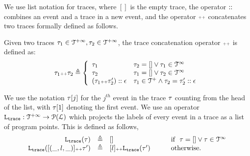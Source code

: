 We use list notation for traces, where $[]$ is the empty trace, the operator ${\small ::}$ combines an event and a trace in a new event, 
and the operator ${\scriptscriptstyle ++}$ concatenates two traces formally defined as follows. 
\begin{defn}
  \label{def:trace_concate}
Given two traces $\mathtt{\tau}_1 \in \mathcal{T}^{+\infty}, \mathtt{\tau}_2 \in \mathcal{T}^{+\infty}$, the trace concatenation operator 
${\scriptscriptstyle ++}$ is defined as:
\[
\trace_1 \tracecat \trace_2 \triangleq
\left\{
\begin{array}{ll} 
  \trace_1 & \trace_2 = [] \lor \trace_1 \in \inftdom \\
  \trace_2 & \trace_1 = [] \lor \trace_2 \in \inftdom \\
  (\trace_1   \tracecat \trace_2'):: \event & \trace_1 \in \ftdom \land \trace_2 = \trace_2' :: \event
\end{array}
\right.
\]
\end{defn}
We use the notation $\mathtt{\tau}[j]$ for the $j^{th}$ event in the trace $\mathtt{\tau}$ counting from the head of the list, with $\mathtt{\tau}[1]$ denoting the first event.
We use an operator $\mathtt{L}_{\mathtt{{trace}}}: \mathcal{T}^{+\infty} \to \mathcal{P}{(\mathcal{L})}$ which projects the labels of every event in a trace as a list of program points. This is defined as follows,
\[
\begin{array}{rcll}
\mathtt{L}_{\mathtt{{trace}}}(\mathtt{\tau}) &\triangleq & [] &\qquad  \mbox{if}~~ \mathtt{\tau} = [] \lor \mathtt{\tau} \in \mathcal{T}^{\infty}
\\ 
\mathtt{L}_{\mathtt{{trace}}}([(\_, l, \_)] {\scriptscriptstyle ++} \mathtt{\tau}') &\triangleq & [l] {\scriptscriptstyle ++} \mathtt{L}_{\mathtt{{trace}}}(\mathtt{\tau}') &\qquad  \mbox{otherwise}.
\end{array}
\]
%
